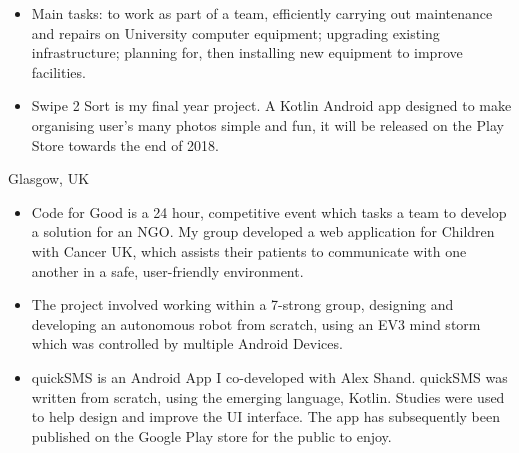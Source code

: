 \documentclass[9pt,a4paper]{altacv}
\begin{document}
\begin{itemize}
\item Main tasks: to work as part of a team, efficiently carrying out maintenance and repairs on University computer equipment; upgrading existing infrastructure; planning for, then installing new equipment to improve facilities.
\end{itemize}



\begin{itemize}
\item Swipe 2 Sort is my final year project. A Kotlin Android app designed to make organising user's many photos simple and fun, it will be released on the Play Store towards the end of 2018.
\end{itemize}
\divider

  {Glasgow, UK}
\begin{itemize}
\item Code for Good is a 24 hour, competitive event which tasks a team to develop a solution for an NGO. My group developed a web application for Children with Cancer UK, which assists their patients to communicate with one another in a safe, user-friendly environment.
\end{itemize}
\divider

\begin{itemize}
\item The project involved working within a 7-strong group, designing and developing an autonomous robot from scratch, using an EV3 mind storm which was controlled by multiple Android Devices.
\end{itemize}
\divider

\begin{itemize}
\item quickSMS is an Android App I co-developed with Alex Shand. quickSMS was written from scratch, using the emerging language, Kotlin. Studies were used to help design and improve the UI interface. The app has subsequently been published on the Google Play store for the public to enjoy.
\end{itemize}
\divider
\end{document}
